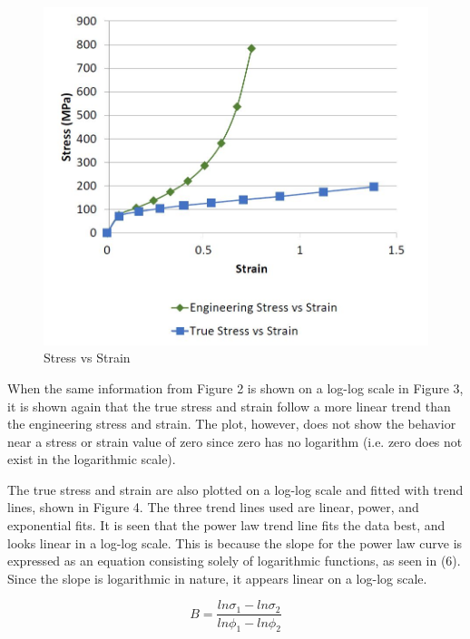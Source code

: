 \documentclass[12pt]{article}
\begin{document}
\begin{figure}[h!]  
  \centering
    \includegraphics[width=\linewidth]{stress_vs_strain.JPG}
    \caption{Stress vs Strain}
\end{figure}

\newpage

When the same information from Figure 2 is shown on a log-log scale in Figure 3, it is shown again that the true stress and strain follow a more linear trend than the engineering stress and strain. The plot, however, does not show the behavior near a stress or strain value of zero since zero has no logarithm (i.e. zero does not exist in the logarithmic scale).
\bigskip

The true stress and strain are also plotted on a log-log scale and fitted with trend lines, shown in Figure 4. The three trend lines used are linear, power, and exponential fits. It is seen that the power law trend line fits the data best, and looks linear in a log-log scale. This is because the slope for the power law curve is expressed as an equation consisting solely of logarithmic functions, as seen in (6). Since the slope is logarithmic in nature, it appears linear on a log-log scale.
\bigskip

\begin{equation}
B = \frac{ln\sigma_{1}-ln\sigma_{2}}{ln\phi_{1}-ln\phi_{2}}
\end{equation}
\end{document}
